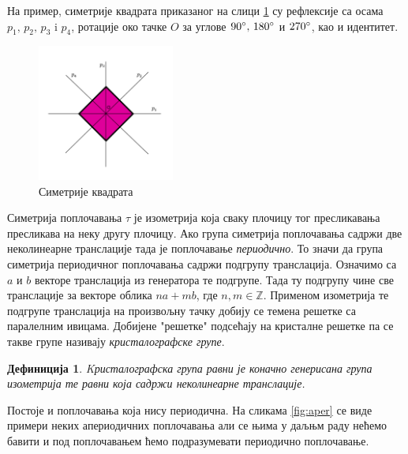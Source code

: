 \documentclass[12pt]{article}
\newtheorem{definition}[theorem]{\bf Дефиниција}
\begin{document}
На пример, симетрије квадрата приказаног на слици \ref{fig:kvadrat} су рефлексије са осама $p_1,\, p_2,\, p_3$ i $p_4$, ротације око тачке $O$ за углове $90\degree,\, 180\degree$ и $ 270\degree$, као и идентитет.
 
 
 
\begin{figure}[H]
\centering
\includegraphics[width=0.4\textwidth]{Simetrije_kocke.png}
\caption{Симетрије квадрата}
\label{fig:kvadrat}
\end{figure}





Симетрија поплочавања $\tau$ је изометрија која сваку плочицу тог пресликавања пресликава на неку другу плочицу.
Ако група симетрија поплочавања садржи две неколинеарне транслације тада је поплочавање \emph{периодично}. То значи да група симетрија периодичног поплочавања садржи подгрупу транслација. Означимо са $a$ и $b$ векторе транслација из генератора те подгрупе. Тада ту подгрупу чине све транслације за  векторе облика $na + mb$, где $n,m \in \mathbb{Z} $. Применом изометрија те подгрупе транслација на произвољну тачку добију се темена решетке са паралелним ивицама. Добијене "решетке" подсећају на кристалне решетке па се такве групе називају \emph{кристалографске групе}.

\begin{definition}Kристалографска група равни је коначно генерисана група изометрија те равни која садржи неколинеарне транслације.
\end{definition}

Постоје и поплочавања која нису периодична. На сликама \ref{fig:aper} се виде примери неких апериодичних поплочавања али се њима у даљњм раду нећемо бавити и под поплочавањем ћемо подразумевати периодично поплочавање.
\end{document}
